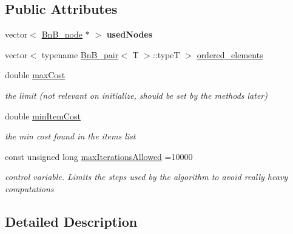 \subsection*{Public Attributes}
\begin{DoxyCompactItemize}
\item 
\hypertarget{class_bn_b___u_p_ab8a6d7f562cea7911112b6b7dfd559c6}{}vector$<$ \hyperlink{class_bn_b__node}{Bn\+B\+\_\+node} $\ast$ $>$ {\bfseries used\+Nodes}\label{class_bn_b___u_p_ab8a6d7f562cea7911112b6b7dfd559c6}

\item 
vector$<$ typename \hyperlink{struct_bn_b__pair}{Bn\+B\+\_\+pair}$<$ T $>$\+::type\+T $>$ \hyperlink{class_bn_b___u_p_a8308ba99698255a402675713b1ac6cb0}{ordered\+\_\+elements}
\item 
\hypertarget{class_bn_b___u_p_a0749a907c11c880f825fd0644a8a2bfd}{}double \hyperlink{class_bn_b___u_p_a0749a907c11c880f825fd0644a8a2bfd}{max\+Cost}\label{class_bn_b___u_p_a0749a907c11c880f825fd0644a8a2bfd}

\begin{DoxyCompactList}\small\item\em the limit (not relevant on initialize, should be set by the methods later) \end{DoxyCompactList}\item 
\hypertarget{class_bn_b___u_p_ae5fdb19ab49f1e0dc93700a42c5884f9}{}double \hyperlink{class_bn_b___u_p_ae5fdb19ab49f1e0dc93700a42c5884f9}{min\+Item\+Cost}\label{class_bn_b___u_p_ae5fdb19ab49f1e0dc93700a42c5884f9}

\begin{DoxyCompactList}\small\item\em the min cost found in the items list \end{DoxyCompactList}\item 
\hypertarget{class_bn_b___u_p_a05b18af61820e672cff387958b393949}{}const unsigned long \hyperlink{class_bn_b___u_p_a05b18af61820e672cff387958b393949}{max\+Iterations\+Allowed} =10000\label{class_bn_b___u_p_a05b18af61820e672cff387958b393949}

\begin{DoxyCompactList}\small\item\em control variable. Limits the steps used by the algorithm to avoid really heavy computations \end{DoxyCompactList}\end{DoxyCompactItemize}


\subsection{Detailed Description}

